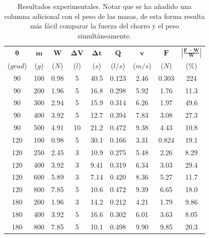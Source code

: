 \documentclass[12pt,a4paper]{article}
\begin{document}
\begin{table}[htbp]
  \centering
    \begin{tabular}{ccccccccc}
    \toprule
    \multicolumn{1}{c}{$\mathbf{\theta}$} & \multicolumn{1}{c}{$\mathbf{m}$} & \multicolumn{1}{c}{$\mathbf{W}$} & \multicolumn{1}{c}{$\mathbf{\Delta V}$} & \multicolumn{1}{c}{$\boldsymbol{\Delta t}$} & \multicolumn{1}{c}{$\boldsymbol{Q}$} & \multicolumn{1}{c}{$\mathbf{v}$} & \multicolumn{1}{c}{$\mathbf{F}$} & \multicolumn{1}{c}{$\mathbf{\left|\frac{F-W}{W}\right|}$} \\
    {\small ($grad$)} & {\small ($g$)} & {\small ($N$)} & {\small ($l$)} & {\small ($s$)} & {\small ($l/s$)}& {\small ($m/s$)} & {\small ($N$)} & {\small ($\%$)}\\    
    \midrule
    90 & 100 & 0.98 & 5 & 40.5 & 0.123 & 2.46 & 0.303 & 224 \\
    90 & 200 & 1.96 & 5 & 16.8 & 0.298 & 5.92 & 1.76 & 11.3 \\
    90 & 300 & 2.94 & 5 & 15.9 & 0.314 & 6.26 & 1.97 & 49.6 \\
    90 & 400 & 3.92 & 5 & 12.7 & 0.394 & 7.83 & 3.08 & 27.3 \\
    90 & 500 & 4.91 & 10 & 21.2 & 0.472 & 9.38 & 4.43 & 10.8 \\
    \midrule
    120 & 100 & 0.98 & 5 & 30.1 & 0.166 & 3.31 & 0.824 & 19.1 \\
    120 & 250 & 2.45 & 3 & 10.9 & 0.275 & 5.48 & 2.26 & 8.29 \\
    120 & 400 & 3.92 & 3 & 9.41 & 0.319 & 6.34 & 3.03 & 29.4 \\
    120 & 600 & 5.89 & 3 & 7.14 & 0.420 & 8.36 & 5.27 & 11.7 \\
    120 & 800 & 7.85 & 5 & 10.6 & 0.472 & 9.39 & 6.65 & 18.0 \\
    \midrule
    180 & 200 & 1.96 & 3 & 14.2 & 0.212 & 4.21 & 1.79 & 9.86 \\
    180 & 400 & 3.92 & 5 & 16.6 & 0.302 & 6.01 & 3.63 & 8.05 \\
    180 & 800 & 7.85 & 5 & 10.1 & 0.498 & 9.90 & 9.85 & 20.3 \\
    \bottomrule
    \end{tabular}
  \caption{Resultados experimentales. Notar que se ha añadido una columna adicional con el peso de las masas, de esta forma resulta más fácil comparar la fuerza del chorro y el peso simultáneamente.}
  \label{tab4}
\end{table}
\end{document}

